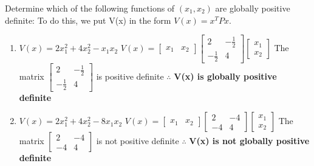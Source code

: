 \documentclass{article}
\begin{document}
  Determine which of the following functions of $(x_1, x_2)$ are globally
  positive definite: \newline
  To do this, we put V(x) in the form $V(x)=x^TPx$.
  \begin{enumerate}[label=(\roman*)]
   \item $V(x) = 2x_1^2 + 4x_2^2 - x_1x_2$ \newline \newline
       $V(x) = \begin{bmatrix}
                x_1 & x_2
              \end{bmatrix}
              \begin{bmatrix}
                2 & -\frac{1}{2} \\
                -\frac{1}{2} & 4
              \end{bmatrix}
              \begin{bmatrix}
                x_1 \\
                x_2
              \end{bmatrix}$
      The matrix $\begin{bmatrix}
                2 & -\frac{1}{2} \\
                -\frac{1}{2} & 4
              \end{bmatrix}$ is positive definite \newline \newline
      $\therefore$ \textbf{V(x) is globally positive definite} \newline

    \item $V(x) = 2x_1^2 + 4x_2^2 - 8x_1x_2$ \newline \newline
       $V(x) = \begin{bmatrix}
                x_1 & x_2
              \end{bmatrix}
              \begin{bmatrix}
                2 & -4 \\
                -4 & 4
              \end{bmatrix}
              \begin{bmatrix}
                x_1 \\
                x_2
              \end{bmatrix}$
      The matrix $\begin{bmatrix}
                2 & -4 \\
                -4 & 4
              \end{bmatrix}$ is not positive definite \newline \newline
      $\therefore$ \textbf{V(x) is not globally positive definite} \newline


\end{enumerate}
\end{document}

